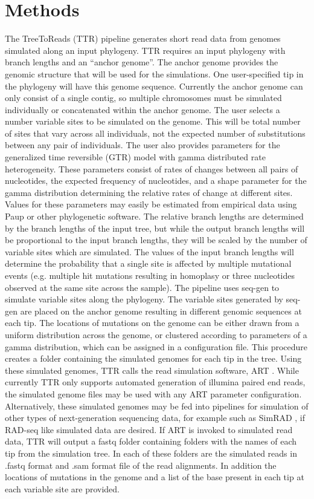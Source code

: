 \documentclass{bioinfo}
\begin{document}
\section{Methods}
The TreeToReads (TTR) pipeline generates short read data from genomes simulated along an input phylogeny.
TTR requires an input phylogeny with branch lengths and an ``anchor genome''. 
The anchor genome provides the genomic structure that will be used for the simulations.
One user-specified tip in the phylogeny will have this genome sequence.
Currently the anchor genome can only consist of a single contig, so multiple chromosomes must be simulated individually or concatenated within the anchor genome.
The user selects a number variable sites to be simulated on the genome.
This will be total number of sites that vary across all individuals, not the expected number of substitutions between any pair of individuals.
The user also provides parameters for the generalized time reversible (GTR) model with gamma distributed rate heterogeneity.
These parameters consist of rates of changes between all pairs of nucleotides, the expected frequency of nucleotides, 
and a shape parameter for the gamma distribution determining the relative rates of change at different sites. 
Values for these parameters may easily be estimated from empirical data using Paup \citep{swofford_paup:_2001} or other phylogenetic software.
The relative branch lengths are determined by the branch lengths of the input tree, but while the output branch lengths will be proportional to the input branch lengths, 
they will be scaled by the number of variable sites which are simulated.
The values of the input branch lengths will determine the probability that a single site is affected by multiple mutational events 
(e.g. multiple hit mutations resulting in homoplasy or three nucleotides observed at the same site across the sample).
The pipeline uses seq-gen \citep{rambaut_seq-gen:_1997} to simulate variable sites along the phylogeny.
The variable sites generated by seq-gen are placed on the anchor genome resulting in different genomic sequences at each tip.
The locations of mutations on the genome can be either drawn from a uniform distribution across the genome, 
or clustered according to parameters of a gamma distribution, which can be assigned in a configuration file.
This procedure creates a folder containing the simulated genomes for each tip in the tree.
Using these simulated genomes, TTR calls the read simulation software, ART \citep{huang_art:_2012}.
While currently TTR only supports automated generation of illumina paired end reads, 
the simulated genome files may be used with any ART parameter configuration.
Alternatively, these simulated genomes may be fed into pipelines for simulation of other types of next-generation sequencing data, 
for example such as SimRAD \citep{lepais_simrad:_2014}, if RAD-seq like simulated data are desired.
If ART is invoked to simulated read data, TTR will output a fastq folder containing folders with the names of each tip from the simulation tree. 
In each of these folders are the simulated reads  in .fastq format and .sam format file of the read alignments.
In addition the locations of mutations in the genome and a list of the base present in each tip at each variable site are provided.
\end{document}
